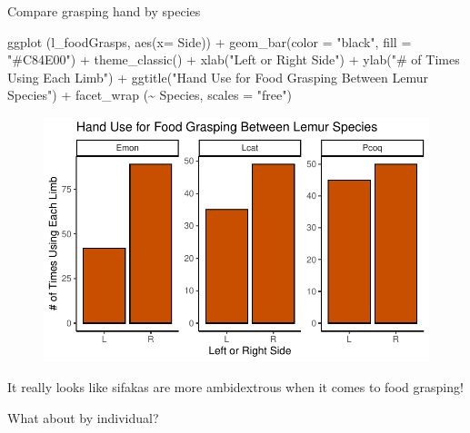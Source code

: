 \documentclass[
  letterpaper,
  DIV=11,
  numbers=noendperiod]{scrartcl}
\newenvironment{Shaded}{\begin{snugshade}}{\end{snugshade}}
\newcommand{\AttributeTok}[1]{\textcolor[rgb]{0.40,0.45,0.13}{#1}}
\newcommand{\FunctionTok}[1]{\textcolor[rgb]{0.28,0.35,0.67}{#1}}
\newcommand{\NormalTok}[1]{\textcolor[rgb]{0.00,0.23,0.31}{#1}}
\newcommand{\SpecialCharTok}[1]{\textcolor[rgb]{0.37,0.37,0.37}{#1}}
\newcommand{\StringTok}[1]{\textcolor[rgb]{0.13,0.47,0.30}{#1}}
\begin{document}
Compare grasping hand by species

\begin{Shaded}
\begin{Highlighting}[]
\FunctionTok{ggplot}\NormalTok{ (l\_foodGrasps, }\FunctionTok{aes}\NormalTok{(}\AttributeTok{x=}\NormalTok{ Side)) }\SpecialCharTok{+}
  \FunctionTok{geom\_bar}\NormalTok{(}\AttributeTok{color =} \StringTok{"black"}\NormalTok{, }\AttributeTok{fill =} \StringTok{"\#C84E00"}\NormalTok{) }\SpecialCharTok{+}
  \FunctionTok{theme\_classic}\NormalTok{() }\SpecialCharTok{+}
  \FunctionTok{xlab}\NormalTok{(}\StringTok{"Left or Right Side"}\NormalTok{) }\SpecialCharTok{+}
  \FunctionTok{ylab}\NormalTok{(}\StringTok{"\# of Times Using Each Limb"}\NormalTok{) }\SpecialCharTok{+}
  \FunctionTok{ggtitle}\NormalTok{(}\StringTok{"Hand Use for Food Grasping Between Lemur Species"}\NormalTok{) }\SpecialCharTok{+}
  \FunctionTok{facet\_wrap}\NormalTok{ (}\SpecialCharTok{\textasciitilde{}}\NormalTok{ Species, }\AttributeTok{scales =} \StringTok{"free"}\NormalTok{)}
\end{Highlighting}
\end{Shaded}

\begin{figure}[H]

{\centering \includegraphics{LeftyLemurs_files/figure-pdf/unnamed-chunk-31-1.pdf}

}

\end{figure}

It really looks like sifakas are more ambidextrous when it comes to food
grasping!

What about by individual?
\end{document}

